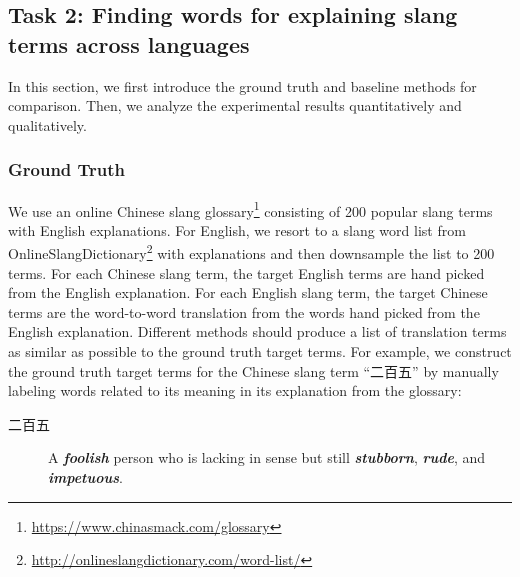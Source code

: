 \subsection{Task 2: Finding words for explaining slang terms across languages}
\label{sec:bleis}
In this section, we first introduce the ground truth and baseline methods for comparison. Then, we analyze the experimental results quantitatively and qualitatively.

\subsubsection{Ground Truth}
We use an online Chinese slang glossary\footnote{{\url{https://www.chinasmack.com/glossary}}} consisting of  200 popular slang terms with English explanations. For English, we resort to a slang word list from OnlineSlangDictionary\footnote{{\url{http://onlineslangdictionary.com/word-list/}}} with explanations and then downsample the list to 200 terms.
For each Chinese slang term, the target English terms are hand picked 
from the English explanation. For each English slang term, the target
Chinese terms are the word-to-word translation from the words hand picked
from the English explanation.
Different methods should produce a list of translation terms 
as similar as possible to the ground truth target terms.
For example, we construct the ground truth target terms for 
the Chinese slang term ``二百五'' by manually labeling words related 
to its meaning in its explanation from the glossary:
\begin{description}
	\item[二百五] A \textbf{\textit{foolish}} person who is lacking in sense but still \textbf{\textit{stubborn}}, \textbf{\textit{rude}}, and \textbf{\textit{impetuous}}.
\end{description}


